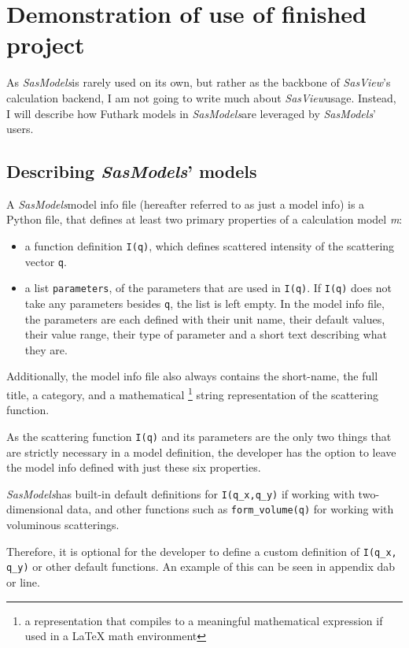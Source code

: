 \documentclass[11pt]{article}
\newcommand{\sasmodels}{\textit{SasModels}}
\newcommand{\sasview}{\textit{SasView}}
\begin{document}
\section{Demonstration of use of finished project}
As \sasmodels is rarely used on its own, but rather as the backbone of 
\sasview's calculation backend, I am not going to write much about 
\sasview usage.
Instead, I will describe how Futhark models in \sasmodels are leveraged 
by \sasmodels' users.


\subsection{Describing \sasmodels' models}
A \sasmodels model info file (hereafter referred to as just a model info) is a 
Python file, that defines at least two primary properties of a 
calculation model \textit{m}:
\begin{itemize}

  \item a function definition \texttt{I(q)}, which defines scattered intensity 
  of the scattering vector \texttt{q}.

  \item a list \texttt{parameters}, of the parameters that are used in 
  \texttt{I(q)}. If \texttt{I(q)} does not take any parameters besides 
  \texttt{q}, the list is left empty.
  In the model info file, the parameters are each defined with their unit name, 
  their default values, their value range, their type of parameter and
  a short text describing what they are.
\end{itemize}

Additionally, the model info file also always contains the short-name, 
the full title, a category, and a mathematical \footnote{a representation 
that compiles to a meaningful mathematical expression if used in a LaTeX math 
environment} string representation of the scattering function.

As the scattering function \texttt{I(q)} and its parameters are the only 
two things that are strictly necessary in a model definition, the developer
has the option to leave the model info defined with just these six properties.

\sasmodels has built-in default definitions for \texttt{I(q_x,q_y)} if working
with two-dimensional data, and other functions such as \texttt{form_volume(q)}
for working with voluminous scatterings.

Therefore, it is optional for the developer to define a custom definition
of \texttt{I(q_x, q_y)} or other default functions.
An example of this can be seen in appendix dab or line.
\end{document}
